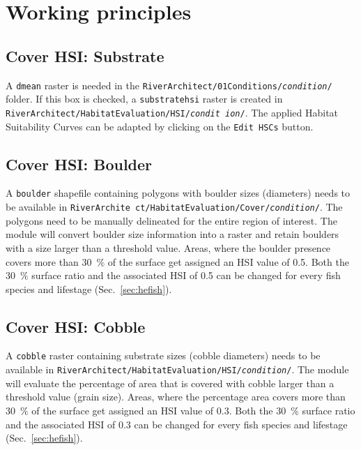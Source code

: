 \section{Working principles}\label{sec:heprin}

\subsection{Cover HSI: Substrate}\label{sec:subshsi}
A \texttt{dmean} raster is needed in the \texttt{RiverArchitect/01{\myUnderscore}Conditions/\textit{condition}/} folder. If this box is checked, a \texttt{substrate{\myUnderscore}hsi} raster is created in \texttt{RiverArchitect/HabitatEvaluation/HSI/\textit{condit ion}/}. The applied Habitat Suitability Curves can be adapted by clicking on the \texttt{Edit HSCs} button.

\subsection{Cover HSI: Boulder}\label{sec:bouhsi}
A \texttt{boulder} shapefile containing polygons with boulder sizes (diameters) needs to be available in \texttt{RiverArchite ct/HabitatEvaluation/Cover/\textit{condition}/}. The polygons need to be manually delineated for the entire region of interest. The module will convert boulder size information into a raster and retain boulders with a size larger than a threshold value. Areas, where the boulder presence covers more than 30~$\%$ of the surface get assigned an HSI value of 0.5. Both the 30~$\%$ surface ratio and the associated HSI of 0.5 can be changed for every fish species and lifestage (Sec.~\ref{sec:hefish}).

\subsection{Cover HSI: Cobble}\label{sec:cobhsi}
A \texttt{cobble} raster containing substrate sizes (cobble diameters) needs to be available in \texttt{RiverArchitect/HabitatEvaluation/HSI/\textit{condition}/}. The module will evaluate the percentage of area that is covered with cobble larger than a threshold value (grain size). Areas, where the percentage area covers more than 30~$\%$ of the surface get assigned an HSI value of 0.3. Both the 30~$\%$ surface ratio and the associated HSI of 0.3 can be changed for every fish species and lifestage (Sec.~\ref{sec:hefish}).

